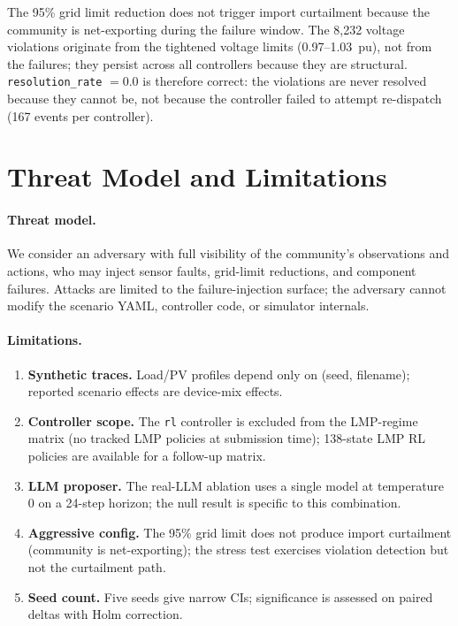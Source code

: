 The 95\% grid limit reduction does not trigger import curtailment because the
community is net-exporting during the failure window. The 8,232 voltage
violations originate from the tightened voltage limits (0.97--1.03~pu), not
from the failures; they persist across all controllers because they are
structural. \texttt{resolution\_rate} $= 0.0$ is therefore correct: the
violations are never resolved because they cannot be, not because the
controller failed to attempt re-dispatch (167 events per controller).

\section{Threat Model and Limitations}\label{sec:threat}

\paragraph{Threat model.} We consider an adversary with full visibility of the
community's observations and actions, who may inject sensor faults, grid-limit
reductions, and component failures. Attacks are limited to the
failure-injection surface; the adversary cannot modify the scenario YAML,
controller code, or simulator internals.

\paragraph{Limitations.}
\begin{enumerate}
\item \textbf{Synthetic traces.} Load/PV profiles depend only on (seed,
  filename); reported scenario effects are device-mix effects.
\item \textbf{Controller scope.} The \texttt{rl} controller is excluded from
  the LMP-regime matrix (no tracked LMP policies at submission time);
  138-state LMP RL policies are available for a follow-up matrix.
\item \textbf{LLM proposer.} The real-LLM ablation uses a single model at
  temperature 0 on a 24-step horizon; the null result is specific to this
  combination.
\item \textbf{Aggressive config.} The 95\% grid limit does not produce import
  curtailment (community is net-exporting); the stress test exercises
  violation detection but not the curtailment path.
\item \textbf{Seed count.} Five seeds give narrow CIs; significance is
  assessed on paired deltas with Holm correction.
\end{enumerate}

